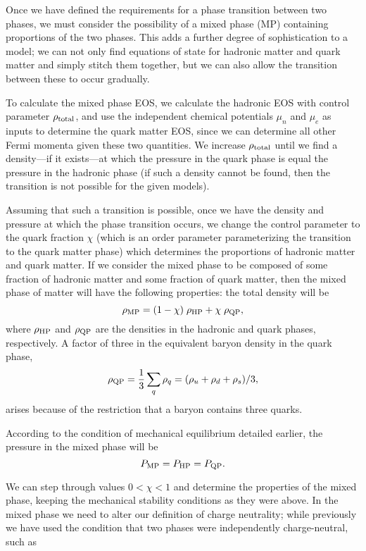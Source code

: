 \documentclass[11pt,a4paper,twoside]{carrollthesis}
\newcommand{\be}{\begin{equation}}
\newcommand{\ee}{\end{equation}}
\newcommand{\reci}[1]{\frac{1}{#1}}
\newcommand{\emdash}{\hspace{1pt}---\hspace{1pt}}
\begin{document}
Once we have defined the requirements for a phase transition between
two phases, we must consider the possibility of a mixed phase (MP)
containing proportions of the two phases. This adds a further degree
of sophistication to a model; we can not only find equations of state
for hadronic matter and quark matter and simply stitch them together,
but we can also allow the transition between these to occur
gradually.\par
%
To calculate the mixed phase EOS, we calculate the hadronic EOS with
control parameter $\rho_{\rm total}$, and use the independent chemical
potentials $\mu_n$ and $\mu_e$ as inputs to determine the quark matter
EOS, since we can determine all other Fermi momenta given these two
quantities. We increase $\rho_{\rm total}$ until we find a
density\emdash if it exists\emdash at which the pressure in the quark
phase is equal the pressure in the hadronic phase (if such a density
cannot be found, then the transition is not possible for the given
models).\par
%
Assuming that such a transition is possible, once we have the density
and pressure at which the phase transition occurs, we change the
control parameter to the quark fraction $\chi$ (which is an order
parameter parameterizing the transition to the quark matter phase)
which determines the proportions of hadronic matter and quark
matter. If we consider the mixed phase to be composed of some fraction
of hadronic matter and some fraction of quark matter, then the mixed
phase of matter will have the following properties: the total density
will be
%
\be 
\label{eq:mp_rho}
\rho_{\rm MP} = (1-\chi)\; \rho_{\rm HP} + \chi\; \rho_{\rm QP},
\ee
%
where $\rho_{\rm HP}$ and $\rho_{\rm QP}$ are the densities in the
hadronic and quark phases, respectively. A factor of three in the
equivalent baryon density in the quark phase,
%
\be 
\label{eq:equivrho}
\rho_{\rm QP} = \reci{3}\sum_q \rho_q = (\rho_u + \rho_d + \rho_s)/3,
\ee
%
arises because of the restriction that a baryon contains three
quarks.\par
%
According to the condition of mechanical equilibrium detailed earlier,
the pressure in the mixed phase will be
%
\be
\label{eq:mp_P}
P_{\rm MP} = P_{\rm HP} = P_{\rm QP}.
\ee
%
\par
%
We can step through values $0\! <\! \chi\! <\! 1$ and determine the
properties of the mixed phase, keeping the mechanical stability
conditions as they were above. In the mixed phase we need to alter our
definition of charge neutrality; while previously we have used the
condition that two phases were independently charge-neutral, such as
\end{document}
